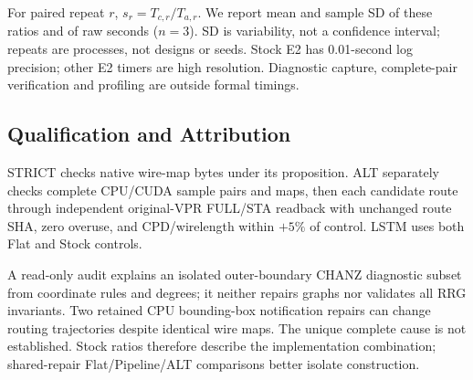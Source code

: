 For paired repeat $r$, $s_r=T_{c,r}/T_{a,r}$. We report mean and sample SD of these ratios and of raw seconds ($n=3$). SD is variability, not a confidence interval; repeats are processes, not designs or seeds. Stock E2 has 0.01-second log precision; other E2 timers are high resolution. Diagnostic capture, complete-pair verification and profiling are outside formal timings.

\subsection{Qualification and Attribution}
STRICT checks native wire-map bytes under its proposition. ALT separately checks complete CPU/CUDA sample pairs and maps, then each candidate route through independent original-VPR FULL/STA readback with unchanged route SHA, zero overuse, and CPD/wirelength within $+5\%$ of control. LSTM uses both Flat and Stock controls.

A read-only audit explains an isolated outer-boundary CHANZ diagnostic subset from coordinate rules and degrees; it neither repairs graphs nor validates all RRG invariants. Two retained CPU bounding-box notification repairs can change routing trajectories despite identical wire maps. The unique complete cause is not established. Stock ratios therefore describe the implementation combination; shared-repair Flat/Pipeline/ALT comparisons better isolate construction.
